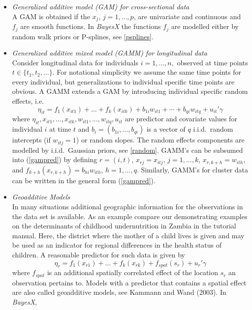 \documentclass[11pt,a4paper,twoside]{bayesxarticle}
\begin{document}
\begin{itemize}
\item {\em Generalized additive model (GAM) for cross-sectional data} \\
A GAM is obtained if  the $x_j$, $j=1,\dots,p$, are univariate and
continuous and $f_j$ are smooth functions. In {\em BayesX} the
functions $f_j$ are modelled either by random walk priors or
P-splines, see \autoref{psplines}.
\item {\em Generalized additive mixed model (GAMM) for longitudinal data} \\
Consider longitudinal data for individuals $i=1,\dots,n,$ observed
at time points $t \in \{ t_1,t_2,\dots \}$. For notational
simplicity we assume the same time points for every individual,
but generalizations to individual specific time points are
obvious. A GAMM extends a GAM by introducing individual specific
random effects, i.e.
$$
\eta_{it} = f_1(x_{it1})+\dots+f_k(x_{itk}) + b_{1i} w_{it1}  +
\cdots + b_{qi} w_{itq}  + u_{it}'\gamma
$$
where
$\eta_{it},x_{it1},\dots,x_{itk},w_{it1},\dots,w_{itq},u_{it}$ are
predictor and covariate values for individual $i$ at time $t$ and
$b_i=(b_{1i},\dots,b_{qi})$ is a vector of $q$ i.i.d.~random
intercepts (if $w_{itj} = 1$) or random slopes. The random effects
components are modelled by i.i.d.~Gaussian priors, see
\autoref{random}. GAMM's can be subsumed into (\ref{gampred}) by
defining $r=(i,t)$, $x_{rj} = x_{itj}$, $j=1,\dots,k$, $x_{r,k+h}
= w_{ith}$, and $f_{k+h}(x_{r,k+h}) = b_{hi} w_{ith}$,
$h=1,\dots,q$. Similarly, GAMM's for cluster data can be written
in the general form (\ref{gampred}).
\item {\em Geoadditive Models} \\
In many situations additional geographic information for the
observations in the data set is available. As an example compare our
demonstrating examples on the determinants of childhood
undernutrition in Zambia in the tutorial manual. Here, the district
where the mother of a child lives is given and may be used as an
indicator for regional differences in the health status of children.
A reasonable predictor for such data is given by
\begin{equation}
\eta_{r} = f_1(x_{r1})+\dots+f_k(x_{rk}) + f_{spat}(s_{r}) + u_r'
\gamma
\end{equation}
where $f_{spat}$ is an additional spatially correlated effect of
the location $s_{r}$ an observation pertains to. Models with a
predictor that contains a spatial effect are also called
geoadditive models, see Kammann and Wand (2003). In {\em BayesX},

\end{itemize}
\end{document}
